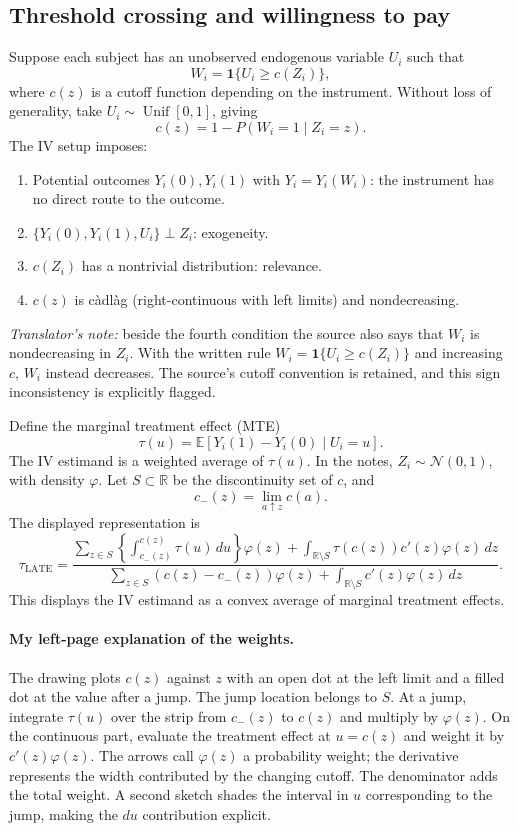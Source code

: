 \subsection{Threshold crossing and willingness to pay}
Suppose each subject has an unobserved endogenous variable $U_i$ such that
\[
 W_i=\mathbf1\{U_i\ge c(Z_i)\},
\]
where $c(z)$ is a cutoff function depending on the instrument. Without loss of generality, take $U_i\sim\operatorname{Unif}[0,1]$, giving
\[
 c(z)=1-P(W_i=1\mid Z_i=z).
\]
The IV setup imposes:
\begin{enumerate}
 \item Potential outcomes $Y_i(0),Y_i(1)$ with $Y_i=Y_i(W_i)$: the instrument has no direct route to the outcome.
 \item $\{Y_i(0),Y_i(1),U_i\}\perp Z_i$: exogeneity.
 \item $c(Z_i)$ has a nontrivial distribution: relevance.
 \item $c(z)$ is c\`adl\`ag (right-continuous with left limits) and nondecreasing.
\end{enumerate}
\textit{Translator's note:} beside the fourth condition the source also says that $W_i$ is nondecreasing in $Z_i$. With the written rule $W_i=\mathbf1\{U_i\ge c(Z_i)\}$ and increasing $c$, $W_i$ instead decreases. The source's cutoff convention is retained, and this sign inconsistency is explicitly flagged.

Define the marginal treatment effect (MTE)
\[
 \tau(u)=\mathbb E[Y_i(1)-Y_i(0)\mid U_i=u].\tag{10.6}
\]
The IV estimand is a weighted average of $\tau(u)$. In the notes, $Z_i\sim\mathcal N(0,1)$, with density $\varphi$. Let $S\subset\mathbb R$ be the discontinuity set of $c$, and
\[
 c_-(z)=\lim_{a\uparrow z}c(a).
\]
The displayed representation is
\[
 \tau_{\mathrm{LATE}}=
 \frac{\displaystyle\sum_{z\in S}
 \left\{\int_{c_-(z)}^{c(z)}\tau(u)\,du\right\}\varphi(z)
 +\int_{\mathbb R\setminus S}\tau(c(z))c'(z)\varphi(z)\,dz}
 {\displaystyle\sum_{z\in S}(c(z)-c_-(z))\varphi(z)
 +\int_{\mathbb R\setminus S}c'(z)\varphi(z)\,dz}.
\]
This displays the IV estimand as a convex average of marginal treatment effects.

\paragraph{My left-page explanation of the weights.}
The drawing plots $c(z)$ against $z$ with an open dot at the left limit and a filled dot at the value after a jump. The jump location belongs to $S$. At a jump, integrate $\tau(u)$ over the strip from $c_-(z)$ to $c(z)$ and multiply by $\varphi(z)$. On the continuous part, evaluate the treatment effect at $u=c(z)$ and weight it by $c'(z)\varphi(z)$. The arrows call $\varphi(z)$ a probability weight; the derivative represents the width contributed by the changing cutoff. The denominator adds the total weight. A second sketch shades the interval in $u$ corresponding to the jump, making the $du$ contribution explicit.

